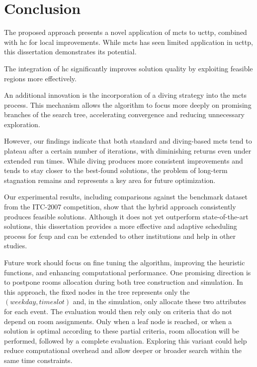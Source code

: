 
\chapter{Conclusion}


\label{Conclusion}

The proposed approach presents a novel application of \ac{mcts} to \ac{ucttp}, combined with \ac{hc} for local improvements. While \ac{mcts} has seen limited application in \ac{ucttp}, this dissertation demonstrates its potential.

The integration of \ac{hc} significantly improves solution quality by exploiting feasible regions more effectively.

An additional innovation is the incorporation of a diving strategy into the \ac{mcts} process. This mechanism allows the algorithm to focus more deeply on promising branches of the search tree, accelerating convergence and reducing unnecessary exploration.

However, our findings indicate that both standard and diving-based \ac{mcts} tend to plateau after a certain number of iterations, with diminishing returns even under extended run times. While diving produces more consistent improvements and tends to stay closer to the best-found solutions, the problem of long-term stagnation remains and represents a key area for future optimization.

Our experimental results, including comparisons against the benchmark dataset from the ITC-2007 competition, show that the hybrid approach consistently produces feasible solutions. Although it does not yet outperform state-of-the-art solutions, this dissertation provides a more effective and adaptive scheduling process for \ac{fcup} and can be extended to other institutions and help in other studies. 

Future work should focus on fine tuning the algorithm, improving the heuristic functions, and enhancing computational performance. One promising direction is to postpone rooms allocation during both tree construction and simulation. In this approach, the fixed nodes in the tree represents only the \((weekday, timeslot)\) and, in the simulation, only allocate these two attributes for each event. The evaluation would then rely only on criteria that do not depend on room assignments. Only when a leaf node is reached, or when a solution is optimal according to these partial criteria, room allocation will be performed, followed by a complete evaluation. Exploring this variant could help reduce computational overhead and allow deeper or broader search within the same time constraints.


